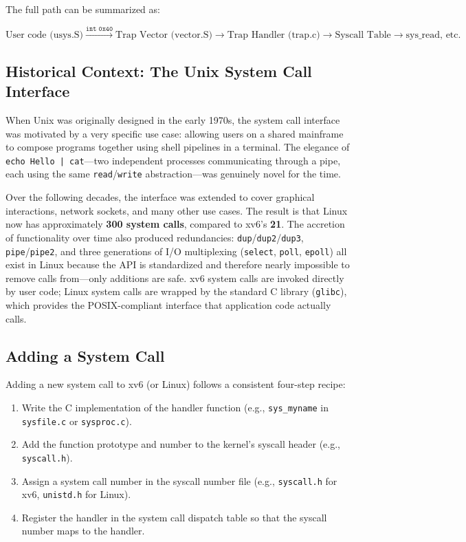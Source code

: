 \documentclass[11pt]{article}
\begin{document}
The full path can be summarized as:

\[
\text{User code (usys.S)} \xrightarrow{\texttt{int 0x40}} \text{Trap Vector (vector.S)} \xrightarrow{} \text{Trap Handler (trap.c)} \xrightarrow{} \text{Syscall Table} \xrightarrow{} \text{sys\_read, etc.}
\]

\subsection{Historical Context: The Unix System Call Interface}

When Unix was originally designed in the early 1970s, the system call interface was motivated by a very specific use case: allowing users on a shared mainframe to compose programs together using shell pipelines in a terminal. The elegance of \texttt{echo Hello | cat}---two independent processes communicating through a pipe, each using the same \texttt{read}/\texttt{write} abstraction---was genuinely novel for the time.

Over the following decades, the interface was extended to cover graphical interactions, network sockets, and many other use cases. The result is that Linux now has approximately \textbf{300 system calls}, compared to xv6's \textbf{21}. The accretion of functionality over time also produced redundancies: \texttt{dup}/\texttt{dup2}/\texttt{dup3}, \texttt{pipe}/\texttt{pipe2}, and three generations of I/O multiplexing (\texttt{select}, \texttt{poll}, \texttt{epoll}) all exist in Linux because the API is standardized and therefore nearly impossible to remove calls from---only additions are safe. xv6 system calls are invoked directly by user code; Linux system calls are wrapped by the standard C library (\texttt{glibc}), which provides the POSIX-compliant interface that application code actually calls.

\subsection{Adding a System Call}

Adding a new system call to xv6 (or Linux) follows a consistent four-step recipe:

\begin{enumerate}
    \item Write the C implementation of the handler function (e.g., \texttt{sys\_myname} in \texttt{sysfile.c} or \texttt{sysproc.c}).
    \item Add the function prototype and number to the kernel's syscall header (e.g., \texttt{syscall.h}).
    \item Assign a system call number in the syscall number file (e.g., \texttt{syscall.h} for xv6, \texttt{unistd.h} for Linux).
    \item Register the handler in the system call dispatch table so that the syscall number maps to the handler.
\end{enumerate}
\end{document}
